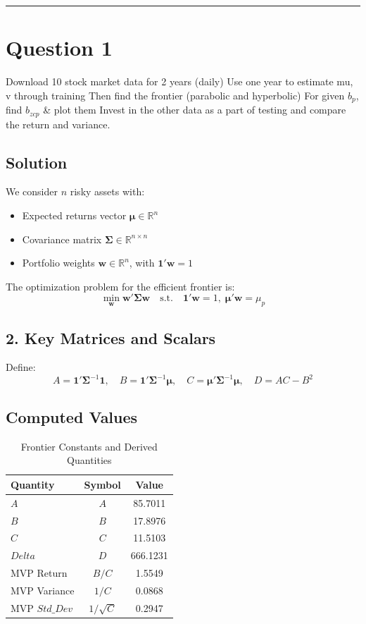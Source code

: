 \hrule



\section*{Question 1}
Download 10 stock market data for 2 years (daily) Use one year to estimate mu, v through training Then find the frontier (parabolic and hyperbolic) For given $b_p$, find $b_{zcp}$ \& plot them Invest in the other data as a part of testing and compare the return and variance.


\subsection*{Solution}
We consider $n$ risky assets with:
\begin{itemize}
    \item Expected returns vector $\boldsymbol{\mu} \in \mathbb{R}^n$
    \item Covariance matrix $\boldsymbol{\Sigma} \in \mathbb{R}^{n \times n}$
    \item Portfolio weights $\mathbf{w} \in \mathbb{R}^n$, with $\mathbf{1}'\mathbf{w} = 1$
\end{itemize}

The optimization problem for the efficient frontier is:
\[
\min_{\mathbf{w}} \mathbf{w}' \boldsymbol{\Sigma} \mathbf{w} 
\quad \text{s.t.} \quad 
\mathbf{1}'\mathbf{w} = 1,\; \boldsymbol{\mu}'\mathbf{w} = \mu_p
\]

\subsection*{2. Key Matrices and Scalars}
Define:
\[
A = \mathbf{1}'\boldsymbol{\Sigma}^{-1}\mathbf{1}, \quad
B = \mathbf{1}'\boldsymbol{\Sigma}^{-1}\boldsymbol{\mu}, \quad
C = \boldsymbol{\mu}'\boldsymbol{\Sigma}^{-1}\boldsymbol{\mu}, \quad
D = AC - B^2
\]

\subsection*{Computed Values}
\begin{table}[H]
    \centering
    \caption{Frontier Constants and Derived Quantities}
    \begin{tabular}{@{}lcc@{}}
        \toprule
        Quantity & Symbol & Value \\ 
        \midrule
        $A$ & $A$ & 85.7011 \\
        $B$ & $B$ & 17.8976 \\
        $C$ & $C$ & 11.5103 \\
        $Delta$ & $D$ & 666.1231 \\
        MVP Return & $B/C$ & 1.5549 \\
        MVP Variance & $1/C$ & 0.0868 \\
        MVP $Std\_Dev$ & $1/\sqrt{C}$ & 0.2947 \\ 
        \bottomrule
    \end{tabular}
\end{table}

